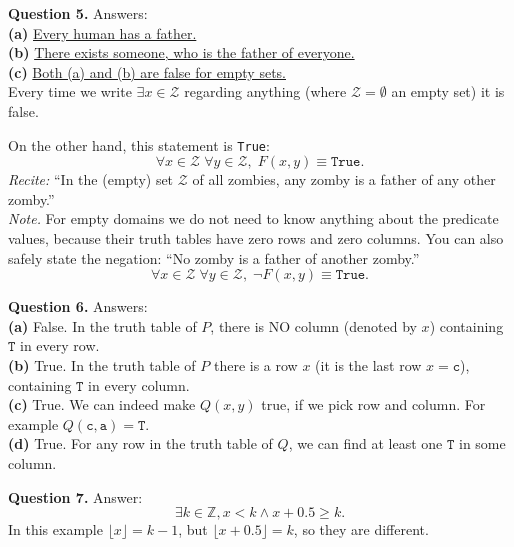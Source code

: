 \documentclass[jou]{apa6}
\begin{document}
\vspace{10pt}
{\bf Question 5.} Answers:\\
{\bf (a)} \underline{Every human has a father.}\\
{\bf (b)} \underline{There exists someone, who is the father of everyone.}\\
{\bf (c)} \underline{Both (a) and (b) are false for empty sets.}\\
Every time we write $\exists x \in \mathcal{Z}$
regarding anything (where $\mathcal{Z} = \emptyset$ \textendash{}
an empty set) it is false. 

On the other hand, this statement is {\tt True}: 
$$\forall x \in \mathcal{Z} \; \forall y \in \mathcal{Z},\; F(x,y) \equiv \mathtt{True}.$$
{\em Recite:} ``In the (empty) set $\mathcal{Z}$ of all 
zombies, any zomby is a father of any other zomby.''\\
{\em Note.} For empty domains we do not need to know anything 
about the predicate values, because their truth tables have
zero rows and zero columns. You can also safely state the negation:
``No zomby is a father of another zomby.''
$$\forall x \in \mathcal{Z} \; \forall y \in \mathcal{Z},\; \neg F(x,y) \equiv \mathtt{True}.$$


\vspace{10pt}
{\bf Question 6.} Answers:\\
{\bf (a)} False. In the truth table of $P$, there is NO 
column (denoted by $x$) containing $\mathtt{T}$ in 
every row.\\
{\bf (b)} True. In the truth table of $P$ there is a row $x$ 
(it is the last row $x = \mathtt{c}$), containing
$\mathtt{T}$ in every column.\\
{\bf (c)} True. We can indeed make $Q(x,y)$ true, if we pick 
row and column. For example $Q(\mathtt{c},\mathtt{a}) = \mathtt{T}$.\\
{\bf (d)} True. For any row in the truth table of $Q$, 
we can find at least one $\mathtt{T}$ in some column. 


\vspace{10pt}
{\bf Question 7.} Answer:\\
$$\exists k \in \mathbb{Z}, x < k \wedge x+0.5 \geq k.$$
In this example $\lfloor x \rfloor = k-1$, but
$\lfloor x+0.5 \rfloor = k$, so they are different.
\end{document}
